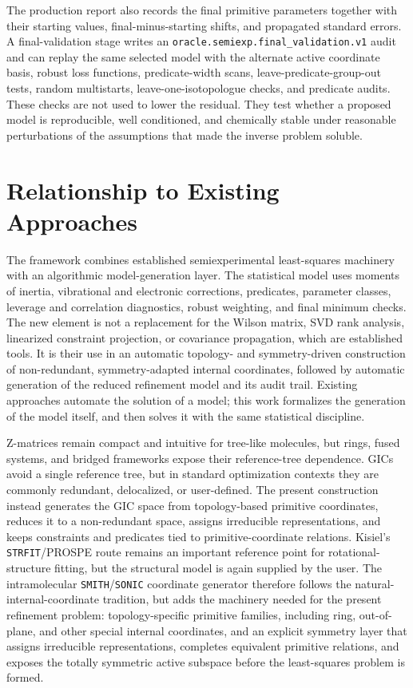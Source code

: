 \documentclass[aip,jcp,reprint,longbibliography,floatfix]{revtex4-2}
\begin{document}
The production report also records the final primitive parameters together
with their starting values, final-minus-starting shifts, and propagated
standard errors. A final-validation stage writes an
\texttt{oracle.semiexp.final\_validation.v1} audit and can replay the same
selected model with the alternate active coordinate basis, robust loss
functions, predicate-width scans, leave-predicate-group-out tests, random
multistarts, leave-one-isotopologue checks, and predicate audits. These checks
are not used to lower the residual. They test whether a proposed model is
reproducible, well conditioned, and chemically stable under reasonable
perturbations of the assumptions that made the inverse problem soluble.


\section{Relationship to Existing Approaches}

The framework combines established semiexperimental least-squares
machinery\cite{Demaison2011EquilibriumStructures,Mendolicchio2017MSR,Bartell1975Predicate,Mendolicchio2025FastDvib}
with an algorithmic model-generation layer. The statistical model
uses moments of inertia, vibrational and electronic corrections, predicates,
parameter classes, leverage and correlation diagnostics, robust weighting, and
final minimum checks. The new element is not a replacement for the Wilson
matrix, SVD rank analysis, linearized constraint projection, or covariance
propagation, which are established tools. It is their use in an automatic
topology- and symmetry-driven construction of non-redundant, symmetry-adapted
internal coordinates, followed by automatic generation of the reduced
refinement model and its audit trail. Existing approaches automate the solution
of a model; this work formalizes the generation of the model itself, and then
solves it with the same statistical discipline.

Z-matrices remain compact and intuitive for tree-like molecules, but rings,
fused systems, and bridged frameworks expose their reference-tree
dependence.\cite{BakerHehre1991ZMatrix} GICs avoid a single reference tree, but
in standard optimization contexts they are commonly redundant, delocalized, or
user-defined. The present construction instead generates the GIC space from
topology-based primitive coordinates, reduces it to a non-redundant space,
assigns irreducible representations, and keeps constraints and predicates tied
to primitive-coordinate relations. Kisiel's \texttt{STRFIT}/PROSPE
route\cite{KisielPROSPE} remains an important reference point for
rotational-structure fitting, but the structural model is again supplied by
the user.\cite{Kanzow2025PCCP}
The intramolecular \texttt{SMITH}/\texttt{SONIC} coordinate generator therefore follows the
natural-internal-coordinate
tradition, but adds the machinery needed for the present refinement problem:
topology-specific primitive families, including ring, out-of-plane, and other
special internal coordinates, and an explicit symmetry layer that assigns
irreducible representations, completes equivalent primitive relations, and
exposes the totally symmetric active subspace before the least-squares problem
is formed.
\end{document}
